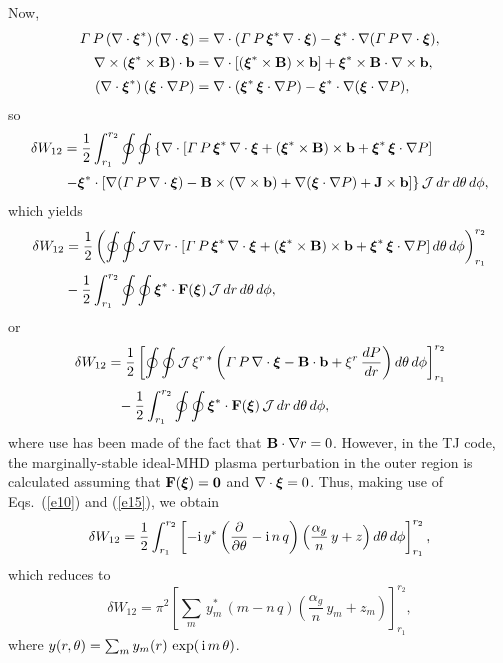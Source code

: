 \documentclass[12pt,prb,aps]{revtex4-1}
\newcommand {\bxi}{\mbox{\boldmath$\xi$}}
\begin{document}
Now,
\begin{align}
{\mit\Gamma}\,P\,(\nabla\cdot\bxi^\ast)\,(\nabla\cdot\bxi)&=\nabla\cdot({\mit\Gamma}\,P\,\bxi^\ast\,\nabla\cdot\bxi)-\bxi^\ast\cdot\nabla(
{\mit\Gamma}\,P\,\nabla\cdot\bxi),\\[0.5ex]
 \nabla\times (\bxi^\ast\times {\bf B})\cdot {\bf b}&= \nabla\cdot[(\bxi^\ast\times {\bf B})\times {\bf b}] + \bxi^\ast\times {\bf B}\cdot\nabla\times {\bf b},\\[0.5ex]
 (\nabla\cdot\bxi^\ast)\,(\bxi\cdot\nabla P)&=\nabla\cdot(\bxi^\ast\,\bxi\cdot\nabla P) -\bxi^\ast\cdot\nabla(\bxi\cdot\nabla P),
\end{align}
so
\begin{align}
\delta W_{12} &= \frac{1}{2}\int_{r_1}^{r_2}\oint\oint\left\{\nabla\cdot[{\mit\Gamma}\,P\,\bxi^\ast\,\nabla\cdot\bxi+ (\bxi^\ast\times {\bf B})\times {\bf b}+\bxi^\ast\,\bxi\cdot\nabla P]\right.\nonumber\\[0.5ex]&\left.-\bxi^\ast\cdot[ \nabla({\mit\Gamma}\,P\,\nabla\cdot\bxi) - {\bf B}\times(\nabla\times {\bf b})+\nabla(\bxi\cdot\nabla P)+{\bf J}\times  {\bf b}]\right\}{\cal J}\,dr\,d\theta\,d\phi,
\end{align}
which yields
\begin{align}
\delta W_{12} &= \frac{1}{2}\left(\oint\oint{\cal J}\,\nabla r\cdot[{\mit\Gamma}\,P\,\bxi^\ast\,\nabla\cdot\bxi+ (\bxi^\ast\times {\bf B})\times {\bf b}+\bxi^\ast\,\bxi\cdot\nabla P]\,d\theta\,d\phi\right)_{r_1}^{r_2}\nonumber\\[0.5ex]
&-\frac{1}{2}\int_{r_1}^{r_2}\oint\oint \bxi^\ast\cdot{\bf F}(\bxi)\,{\cal J}\,dr\,d\theta\,d\phi,
\end{align}
or
\begin{align}
\delta W_{12} &= \frac{1}{2}\left[\oint\oint{\cal J}\,\xi^{r\,\ast}\left({\mit\Gamma}\,P\,\nabla\cdot\bxi -{\bf B}\cdot{\bf b} + \xi^r\,\frac{dP}{dr}\right)d\theta\,d\phi\right]_{r_1}^{r_2}\nonumber\\[0.5ex]&\phantom{=}-\frac{1}{2}\int_{r_1}^{r_2}\oint\oint\bxi^\ast\cdot{\bf F}(\bxi)\,{\cal J}\,dr\,d\theta\,d\phi,
\end{align}
where use has been made of the fact that ${\bf B}\cdot\nabla r = 0$.  However, in the TJ code, the marginally-stable ideal-MHD  plasma perturbation in the outer region is calculated assuming that ${\bf F}(\bxi)={\bf 0}$ and
$\nabla\cdot\bxi=0$.\cite{tj}   Thus, making use of Eqs.~(\ref{e10}) and (\ref{e15}), we obtain 
\begin{equation}
\delta W_{12} = \frac{1}{2}\int_{r_1}^{r_2}\left[-{\rm i}\,y^\ast\left(\frac{\partial}{\partial\theta}-{\rm i}\,n\,q\right)\left(\frac{\alpha_g}{n}\,y+z\right)d\theta\,d\phi\right]_{r_1}^{r_2},
\end{equation}
which reduces to
\begin{equation}
\delta W_{12}= \pi^2\left[\sum_m\,y_m^\ast\,(m-n\,q)\left(\frac{\alpha_g}{n}\,y_m+z_m\right)\right]_{r_1}^{r_2},
\end{equation}
where $y(r,\theta)=\sum_m y_m(r)\,\exp(\,{\rm i}\,m\,\theta)$. 
\end{document}
